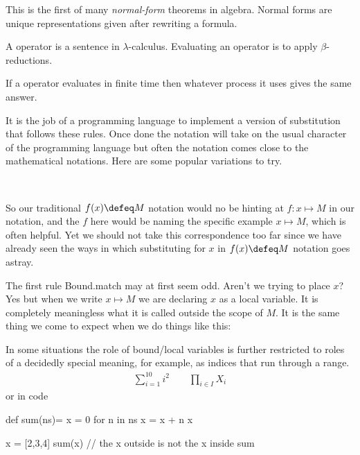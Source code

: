 This is the first of many \emph{normal-form} theorems in algebra.
Normal forms are unique representations given after rewriting a formula.


\begin{definition}
    A operator is a sentence in $\lambda$-calculus.
    Evaluating an operator is to apply $\beta$-reductions.
\end{definition}

\begin{corollary}
    If a operator evaluates in finite time then whatever process it uses 
    gives the same answer.
\end{corollary}



It is the job of a programming language to implement a version 
of substitution that follows these rules.  Once done the notation will take 
on the usual character of the programming language but often the notation 
comes close to the mathematical notations.  Here are some popular variations to try.
\begin{center}
    \hspace{1cm}
    \hspace{1cm}
    \\
    \hspace{1cm}
\end{center} 


So our traditional $f(x)\defeq M$ notation would no be hinting at 
$f:x\mapsto M$ in our notation, and the $f$ here would be naming 
the specific example $x\mapsto M$, which is often helpful.  Yet 
we should not take this correspondence too far since we have already 
seen the ways in which substituting for $x$ in $f(x)\defeq M$ notation 
goes astray.

The first rule Bound.match may at first seem odd.  Aren't we trying to place $x$?
Yes but when we write $x\mapsto M$ we are declaring $x$ as a local variable.  
It is completely meaningless what it is called outside the scope of $M$.
It is the same thing we come to expect when we do things like this:


In some situations the role of bound/local variables is further 
restricted to roles of a decidedly special meaning, for example, as indices that 
run through a range.
\begin{align*}
    \sum_{i=1}^{10} i^2 \qquad \prod_{i\in I}X_i 
\end{align*}
or in code 
\begin{center}
\begin{Pcode}[]
def sum(ns)= {
  x = 0
  for n in ns 
    x = x + n
  x  
}

x = [2,3,4]
sum(x)  // the x outside is not the x inside sum
\end{Pcode}
\end{center}